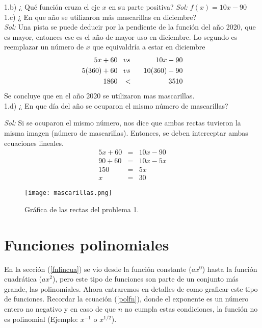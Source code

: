 \noindent 1.b) ¿ Qué función cruza el eje $x$ en su parte positiva? 
\noindent \textit{Sol:} $f(x)=10x-90$\\

\noindent 1.c) ¿ En que año se utilizaron más mascarillas en diciembre?\\
\noindent \textit{Sol:} Una pista se puede deducir por la pendiente de la función del año 2020, que es mayor, entonces ese es el año de mayor uso en diciembre. Lo segundo es reemplazar un número de $x$ que equivaldría a estar en diciembre \\
\begin{eqnarray*}
5x+60 \hspace{8px} &vs& \hspace{8px} 10x-90 \\
5(360)+60 \hspace{8px} &vs& \hspace{8px} 10(360)-90 \\
1860 \hspace{8px} &< & \hspace{8px} 3510 
\end{eqnarray*}
Se concluye que en el año 2020 se utilizaron mas mascarillas.\\

\noindent 1.d) ¿ En que día del año se ocuparon el mismo número de mascarillas?

\noindent \textit{Sol:} Si se ocuparon el mismo número, nos dice que ambas rectas tuvieron la misma imagen (número de mascarillas). Entonces, se deben interceptar ambas ecuaciones lineales. \\
\begin{eqnarray*}
5x+60  &=&  10x-90 \\
90+60  &=&  10x-5x\\
150  &=&  5x\\
x  &=&  30
\end{eqnarray*}

\begin{center}
\begin{figure}[h!]
\centering
\texttt{[image: mascarillas.png]}
\caption{Gráfica de las rectas del problema 1.} \label{prob1}
\end{figure}
\end{center}

\section{Funciones polinomiales}
En la sección (\ref{fnlincua}) se vio desde la función constante ($ax^{0}$) hasta la función cuadrática ($ax^{2}$), pero este tipo de funciones son parte de un conjunto más grande, las polinomiales. Ahora entraremos en detalles de como graficar este tipo de funciones. Recordar la ecuación (\ref{polfn}), donde el exponente es un número entero no negativo y en caso de que $n$ no cumpla estas condiciones, la función no es polinomial (Ejemplo: $x^{-1}$ o $x^{1/2}$).

